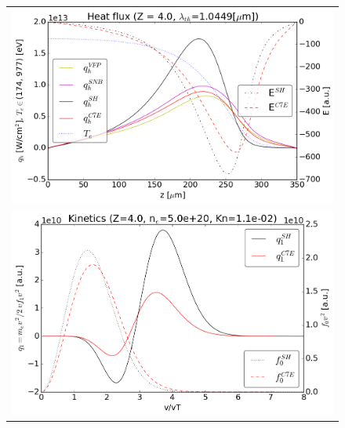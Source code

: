 \documentclass[preprint,12pt]{elsarticle}
\begin{document}
\begin{figure}[tbh]
  \begin{center}
    \begin{tabular}{c}
      \includegraphics[width=1.0\textwidth]{../VFPdata/C7_heatflux_12ps.png} \\ 
      \includegraphics[width=1.0\textwidth]{../VFPdata/C7_kinetics_12ps.png}
    \end{tabular}
  \caption{
  }
  \end{center}
  \label{fig:AWBScorrection_f1}
\end{figure}
\end{document}
